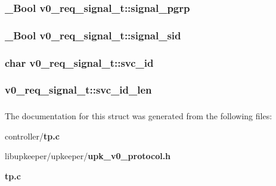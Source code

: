 \subsubsection[{signal\_\-pgrp}]{\setlength{\rightskip}{0pt plus 5cm}\_\-Bool {\bf v0\_\-req\_\-signal\_\-t::signal\_\-pgrp}}\label{structv0__req__signal__t_a787c8d43349d24c77a3658e5af1f2f04}
\subsubsection[{signal\_\-sid}]{\setlength{\rightskip}{0pt plus 5cm}\_\-Bool {\bf v0\_\-req\_\-signal\_\-t::signal\_\-sid}}\label{structv0__req__signal__t_aa27d8a761e3b66b4695ae0b33b937820}
\subsubsection[{svc\_\-id}]{\setlength{\rightskip}{0pt plus 5cm}char {\bf v0\_\-req\_\-signal\_\-t::svc\_\-id}}\label{structv0__req__signal__t_a311e89c8466e9605e01cae236506ba56}
\subsubsection[{svc\_\-id\_\-len}]{ {\bf v0\_\-req\_\-signal\_\-t::svc\_\-id\_\-len}}\label{structv0__req__signal__t_aec15440d92b699d6025c2e4fba49d0ec}
\subsubsection[{UPK\_\-V0\_\-REQ\_\-SIGNAL\_\-T\_\-FIELDS}]{}\label{structv0__req__signal__t_a9a563de2d6480dc749ddd1edb5843450}


The documentation for this struct was generated from the following files:\begin{DoxyCompactItemize}
\item 
controller/{\bf tp.c}\item 
libupkeeper/upkeeper/{\bf upk\_\-v0\_\-protocol.h}\item 
{\bf tp.c}\end{DoxyCompactItemize}
